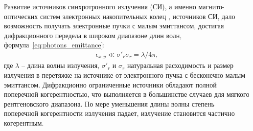 

Развитие источников синхротронного излучения (СИ), а именно магнито-оптических систем электронных накопительных колец \cite{bartolini_challenges_2021}, \cite{hettel_challenges_2014} источников СИ, дало возможность получать электронные пучки с малым эмиттансом, достигая дифракционного передела в широком диапазоне длин волн, формула~\ref{eq:photons_emittance}:
\begin{align}
	\epsilon_{x, y} \ll \sigma'_{r}\sigma_{r} = \lambda/4\pi,
	\label{eq:photons_emittance}
\end{align}
где $\lambda$ -- длина волны излучения, $\sigma'_{r}$ и $\sigma_{r}$ натуральная расходимость и размер излучения в перетяжке на источнике от электронного пучка с бесконечно малым эмиттансом. Дифракционно ограниченные источники обладают полной поперечной когерентностью, что выполняется в большинстве случаев для мягкого рентгеновского диапазона. По мере уменьшения длины волны степень поперечной когерентности излучения падает, излучение становится частично когерентным. 

